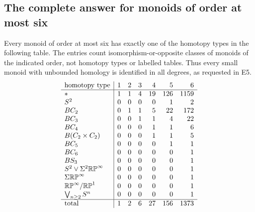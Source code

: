 \subsection{The complete answer for monoids of order at most six}
\begin{theorem}\label{E:all-six-types}
Every monoid of order at most six has exactly one of the homotopy types
in the following table. The entries count isomorphism-or-opposite classes
of monoids of the indicated order, not homotopy types or labelled tables.
Thus every small monoid with unbounded homology is identified in all
degrees, as requested in E5.
\[
\begin{array}{l|rrrrrr}
\text{homotopy type}&1&2&3&4&5&6\\\hline
* & 1 & 1 & 4 & 19 & 126 & 1159 \\
S^2 & 0 & 0 & 0 & 0 & 1 & 2 \\
BC_2 & 0 & 1 & 1 & 5 & 22 & 172 \\
BC_3 & 0 & 0 & 1 & 1 & 4 & 22 \\
BC_4 & 0 & 0 & 0 & 1 & 1 & 6 \\
B(C_2\times C_2) & 0 & 0 & 0 & 1 & 1 & 5 \\
BC_5 & 0 & 0 & 0 & 0 & 1 & 1 \\
BC_6 & 0 & 0 & 0 & 0 & 0 & 1 \\
BS_3 & 0 & 0 & 0 & 0 & 0 & 1 \\
S^2\vee\Sigma^2\mathbb {RP}^\infty & 0 & 0 & 0 & 0 & 0 & 1 \\
\Sigma\mathbb {RP}^\infty & 0 & 0 & 0 & 0 & 0 & 1 \\
\mathbb {RP}^\infty/\mathbb {RP}^1 & 0 & 0 & 0 & 0 & 0 & 1 \\
\bigvee_{n\geq2}S^n & 0 & 0 & 0 & 0 & 0 & 1 \\
\hline
\text{total}&1&2&6&27&156&1373
\end{array}
\]
\end{theorem}
